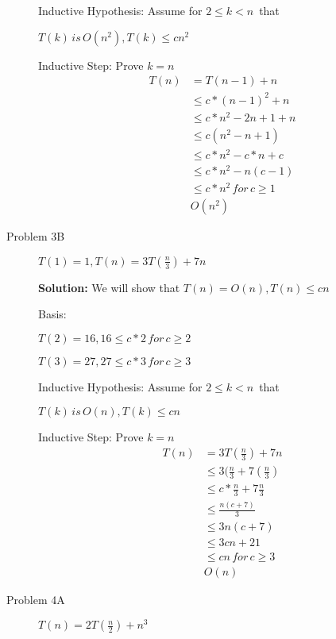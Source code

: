 \documentclass[12pt]{article}
\begin{document}
\begin{description}
\setlength{\parindent}{0cm}Inductive Hypothesis: Assume for \(2 \leq k < n\, \) that

\setlength{\parindent}{1cm} \( T(k)\, is\, O(n^2), T(k) \leq cn^2 \)

\setlength{\parindent}{0cm} Inductive Step: Prove $k=n$
\begin{align*}
T(n) & = T(n-1) + n \\
     & \leq c*(n-1)^2 + n \\
     & \leq c*n^2 - 2n + 1 + n \\
     & \leq c(n^2 - n + 1) \\
     & \leq c*n^2 -c*n + c \\
     & \leq c*n^2 - n(c - 1) \\
     & \leq c*n^2\, for \, c \geq 1 \\
     & O(n^2)  
\end{align*}
\smallskip
\item[Problem 3B] \( T(1) = 1, T(n) = 3T(\frac{n}{3})+ 7n \)
\smallskip

\textbf{Solution:}
We will show that \( T(n) = O(n), T(n) \leq cn \)

Basis:

\setlength{\parindent}{1cm} \( T(2) = 16, 16 \leq c*2\, for\, c \geq 2 \)

\setlength{\parindent}{1cm} \( T(3) = 27, 27 \leq c*3\, for\, c \geq 3 \)

\setlength{\parindent}{0cm}Inductive Hypothesis: Assume for \(2 \leq k < n\, \) that

\setlength{\parindent}{1cm} \( T(k)\, is\, O(n), T(k) \leq cn \)

\setlength{\parindent}{0cm} Inductive Step: Prove $k=n$
\begin{align*}
T(n) & = 3T(\frac{n}{3}) + 7n \\
     & \leq 3(\frac{n}{3} + 7(\frac{n}{3}) \\
     & \leq c*\frac{n}{3} + 7\frac{n}{3} \\
     & \leq \frac{n(c + 7)}{3} \\
     & \leq 3n(c + 7) \\
     & \leq 3cn+21 \\
     & \leq cn\, for\, c \geq 3 \\
     & O(n)  
\end{align*}
\smallskip
\item[Problem 4A] \( T(n)=2T(\frac{n}{2})+n^3 \)


\end{description}
\end{document}
